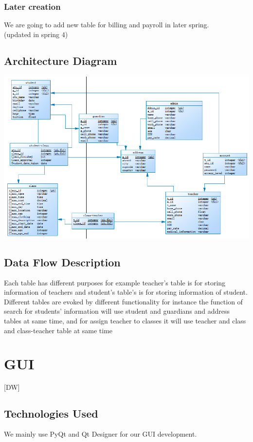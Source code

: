 \subsubsection{Later creation}
We are going to add new table for billing and payroll in later spring.\\
(updated in spring 4)\\

\subsection{ Architecture  Diagram}
\includegraphics[scale=0.8]{pics/database.png}\\


\subsection{Data Flow Description}
Each table has different purposes for example teacher's table is for storing information of teachers and student's table's is for storing information of student. Different tables are evoked by different functionality for instance the function of search for students' information will use student and guardians and address tables at same time, and for assign teacher to classes it will use teacher and class and class-teacher table at same time


\section{GUI}
[DW]
\subsection{Technologies  Used}
We mainly use PyQt and Qt Designer for our GUI development.

